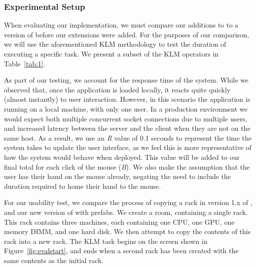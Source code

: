 \documentclass[11pt]{article}
\begin{document}
		\subsubsection{Experimental Setup}
			When evaluating our implementation, we must compare our additions to \opendc{} to a version of \opendc{} before our extensions were added.
			For the purposes of our comparison, we will use the aforementioned KLM methodology to test the duration of executing a specific task.
			We present a subset of the KLM operators in Table~\ref{tab:1}.

			As part of our testing, we account for the response time of the system. 
			While we observed that, once the application is loaded locally, it reacts quite quickly (almost instantly) to user interaction.
			However, in this scenario the application is running on a local machine, with only one user.
			In a production environment we would expect both multiple concurrent socket connections due to multiple users, and increased latency between the server and the client when they are not on the same host. 
			As a result, we use an \textit{R} value of 0.1 seconds to represent the time the system takes to update the user interface, as we feel this is more representative of how the system would behave when deployed.
			This value will be added to our final total for each click of the mouse (\textit{B}).
			We also make the assumption that the user has their hand on the mouse already, negating the need to include the duration required to home their hand to the mouse.

			For our usability test, we compare the process of copying a rack in version 1.x of \opendc{}, and our new version of \opendc{} with prefabs.
			We create a room, containing a single rack.
			This rack contains three machines, each containing one CPU, one GPU, one memory DIMM, and one hard disk.
			We then attempt to copy the contents of this rack into a new rack.
			The KLM task begins on the screen shown in Figure~\ref{fig:evalstart}, and ends when a second rack has been created with the same contents as the initial rack.
			
\end{document}
